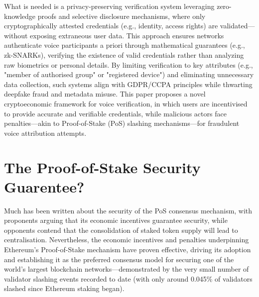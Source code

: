 \documentclass[11pt,a4paper]{article}
\begin{document}
What is needed is a privacy-preserving verification system leveraging zero-knowledge proofs and selective disclosure mechanisms, where only cryptographically attested credentials (e.g., identity, access rights) are validated—without exposing extraneous user data.
This approach ensures networks authenticate voice participants a priori through mathematical guarantees (e.g., zk-SNARKs), verifying the existence of valid credentials rather than analyzing raw biometrics or personal details.
By limiting verification to key attributes (e.g., "member of authorised group" or "registered device") and eliminating unnecessary data collection, such systems align with GDPR/CCPA principles while thwarting deepfake fraud and metadata misuse.
This paper proposes a novel cryptoeconomic framework for voice verification, in which users are incentivised to provide accurate and verifiable credentials, while malicious actors face penalties—akin to Proof-of-Stake (PoS) slashing mechanisms—for fraudulent voice attribution attempts.

\section{The Proof-of-Stake Security Guarentee?}
\label{sec:background}
Much has been written about the security of the PoS consensus mechanism, with proponents arguing that its economic incentives guarantee security, while opponents contend that the consolidation of staked token supply will lead to centralisation.
Nevertheless, the economic incentives and penalties underpinning Ethereum’s Proof-of-Stake mechanism have proven effective, driving its adoption and establishing it as the preferred consensus model for securing one of the world’s largest blockchain networks—demonstrated by the very small number of validator slashing events recorded to date (with only around 0.045\% of validators slashed since Ethereum staking began).
\end{document}
